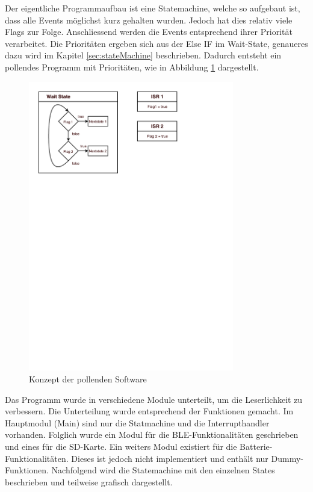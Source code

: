 Der eigentliche Programmaufbau ist eine Statemachine, welche so aufgebaut ist, dass alle Events möglichst kurz gehalten wurden. Jedoch hat dies relativ viele Flags zur Folge. Anschliessend werden die Events entsprechend ihrer Priorität verarbeitet. Die Prioritäten ergeben sich aus der Else IF im Wait-State, genaueres dazu wird im Kapitel \ref{sec:stateMachine} beschrieben. Dadurch entsteht ein pollendes Programm mit Prioritäten, wie in Abbildung \ref{fig:Software_approach} dargestellt.

\begin{figure}[htbp!!!!]
	\centering
	\includegraphics[width=0.8\textwidth]{Data/Software_Pollend}
	\caption[Software:Pollend]{Konzept der pollenden Software}
	\label{fig:Software_approach}
\end{figure}

Das Programm wurde in verschiedene Module unterteilt, um die Leserlichkeit zu verbessern. Die Unterteilung wurde entsprechend der Funktionen gemacht. Im Hauptmodul (Main) sind nur die Statmachine und die Interrupthandler vorhanden. Folglich wurde ein Modul für die BLE-Funktionalitäten geschrieben und eines für die SD-Karte. Ein weiters Modul existiert für die Batterie-Funktionalitäten. Dieses ist jedoch nicht implementiert und enthält nur Dummy-Funktionen. Nachfolgend wird die Statemachine mit den einzelnen States beschrieben und teilweise grafisch dargestellt.






